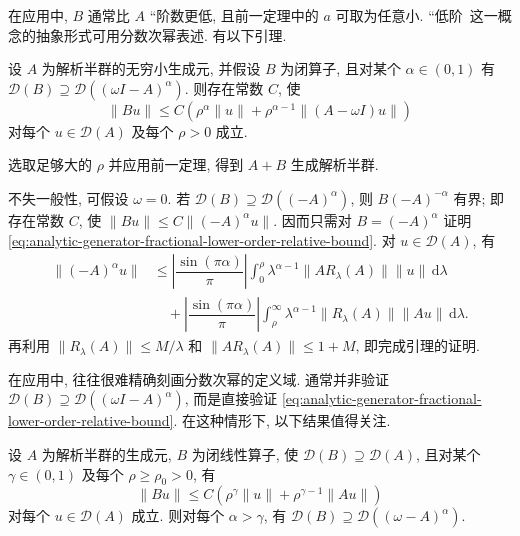在应用中, $B$ 通常比 $A$ ``阶数更低\textquotesingle\textquotesingle, 且前一定理中的 $a$ 可取为任意小. ``低阶\textquotesingle\textquotesingle\ 这一概念的抽象形式可用分数次幂表述. 有以下引理.

\begin{Lemma}
\label{lem:analytic-fractional-lower-order-relative-bound}
设 $A$ 为解析半群的无穷小生成元, 并假设 $B$ 为闭算子, 且对某个 $\alpha\in(0,1)$ 有 $\mathcal{D}(B)\supseteq\mathcal{D}((\omega I-A)^\alpha)$. 则存在常数 $C$, 使
\begin{equation}\label{eq:analytic-generator-fractional-lower-order-relative-bound}
\|Bu\|\leq C(\rho^\alpha\|u\|+\rho^{\alpha-1}\|(A-\omega I)u\|)
\end{equation}
对每个 $u\in\mathcal{D}(A)$ 及每个 $\rho>0$ 成立.
\end{Lemma}

选取足够大的 $\rho$ 并应用前一定理, 得到 $A+B$ 生成解析半群.

\begin{Proof}
不失一般性, 可假设 $\omega=0$. 若 $\mathcal{D}(B)\supseteq\mathcal{D}((-A)^\alpha)$, 则 $B(-A)^{-\alpha}$ 有界; 即存在常数 $C$, 使 $\|Bu\|\leq C\|(-A)^\alpha u\|$. 因而只需对 $B=(-A)^\alpha$ 证明 \eqref{eq:analytic-generator-fractional-lower-order-relative-bound}. 对 $u\in\mathcal{D}(A)$, 有\[\begin{aligned}
\|(-A)^\alpha u\|&\leq\left|\dfrac{\sin(\pi\alpha)}{\pi}\right|\int_0^\rho\lambda^{\alpha-1}\|AR_\lambda(A)\|\|u\|\,\mathrm{d}\lambda\\
&\quad+\left|\dfrac{\sin(\pi\alpha)}{\pi}\right|\int_\rho^\infty\lambda^{\alpha-1}\|R_\lambda(A)\|\|Au\|\,\mathrm{d}\lambda.
\end{aligned}\]再利用 $\|R_\lambda(A)\|\leq M/\lambda$ 和 $\|AR_\lambda(A)\|\leq1+M$, 即完成引理的证明.
\end{Proof}

在应用中, 往往很难精确刻画分数次幂的定义域. 通常并非验证 $\mathcal{D}(B)\supseteq\mathcal{D}((\omega I-A)^\alpha)$, 而是直接验证 \eqref{eq:analytic-generator-fractional-lower-order-relative-bound}. 在这种情形下, 以下结果值得关注.

\begin{Lemma}
\label{lem:analytic-relative-estimate-implies-fractional-domain}
设 $A$ 为解析半群的生成元, $B$ 为闭线性算子, 使 $\mathcal{D}(B)\supseteq\mathcal{D}(A)$, 且对某个 $\gamma\in(0,1)$ 及每个 $\rho\geq\rho_0>0$, 有
\begin{equation}\label{eq:analytic-generator-relative-estimate-fractional-domain-hypothesis}
\|Bu\|\leq C(\rho^\gamma\|u\|+\rho^{\gamma-1}\|Au\|)
\end{equation}
对每个 $u\in\mathcal{D}(A)$ 成立. 则对每个 $\alpha>\gamma$, 有 $\mathcal{D}(B)\supseteq\mathcal{D}((\omega-A)^\alpha)$.
\end{Lemma}

